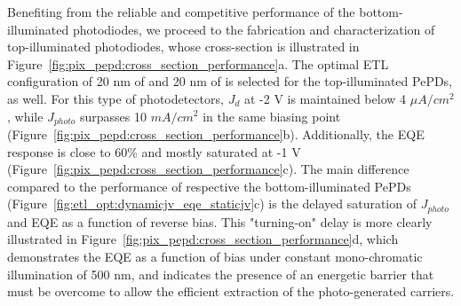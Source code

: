 Benefiting from the reliable and competitive performance of the bottom-illuminated photodiodes, we proceed to the fabrication and characterization of top-illuminated photodiodes, whose cross-section is illustrated in Figure~\ref{fig:pix_pepd:cross_section_performance}a. The optimal ETL configuration of 20 nm of  and 20 nm of  is selected for the top-illuminated PePDs, as well. For this type of photodetectors, $J_d$ at -2 V is maintained below 4 $\mu A/cm^2$, while $J_{photo}$ surpasses 10 $mA/cm^2$ in the same biasing point (Figure~\ref{fig:pix_pepd:cross_section_performance}b). Additionally, the EQE response is close to 60\% and mostly saturated at -1 V (Figure~\ref{fig:pix_pepd:cross_section_performance}c). The main difference compared to the performance of respective the bottom-illuminated PePDs (Figure~\ref{fig:etl_opt:dynamicjv_eqe_staticjv}c) is the delayed saturation of $J_{photo}$ and EQE as a function of reverse bias. This "turning-on" delay is more clearly illustrated in Figure~\ref{fig:pix_pepd:cross_section_performance}d, which demonstrates the EQE as a function of bias under constant mono-chromatic illumination of 500 nm, and indicates the presence of an energetic barrier that must be overcome to allow the efficient extraction of the photo-generated carriers. 

